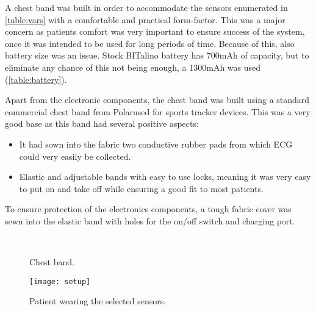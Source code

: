 A chest band was built in order to accommodate the sensors enumerated in \cref{table:vars} with a comfortable and practical form-factor. This was a major concern as patients comfort was very important to ensure success of the system, once it was intended to be used for long periods of time. Because of this, also battery size was an issue. Stock BITalino battery has 700mAh of capacity, but to eliminate any chance of this not being enough, a 1300mAh was used (\cref{table:battery}).

Apart from the electronic components, the chest band was built using a standard commercial chest band from Polar\textregistered  used for sports tracker devices. This was a very good base as this band had several positive aspects:

\begin{itemize}
	\item It had sown into the fabric two conductive rubber pads from which ECG could very easily be collected.
	\item Elastic and adjustable bands with easy to use locks, meaning it was very easy to put on and take off while ensuring a good fit to most patients.
\end{itemize}

To ensure protection of the electronics components, a tough fabric cover was sewn into the elastic band with holes for the on/off switch and charging port.

\begin{figure}[!h]
	\label{fig:faixa}
	\\
	\caption{Chest band.}
\end{figure}


\begin{figure}
	\centering
	\texttt{[image: setup]}
	\caption{Patient wearing the selected sensors.}
	\label{fig:setup}
\end{figure}


